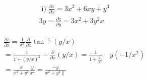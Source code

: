 \documentclass[10pt]{article}
\begin{document}
$$
\begin{aligned}
& \text { i) } \frac{\partial z}{\partial x}=3 x^{2}+6 x y+y^{3} \\
& 3 y=\frac{\partial z}{\partial y}=3 x^{2}+3 y^{2} x
\end{aligned}
$$

$$
\begin{aligned}
& \frac{\partial z}{\partial x}=\frac{1}{x^{1}} \frac{\partial}{\partial x} \tan ^{-1}(y / x) \\
& =\frac{1}{1+(y / x)^{2}}-\frac{\partial}{\partial x}(y / x)=\frac{1}{1+\frac{y^{2}}{x^{2}}} \quad y\left(-1 / x^{2}\right) \\
& =\frac{x}{x^{2}+y^{2}} \frac{y}{x^{2}}=\frac{-y}{x^{2}+y^{2} \|}
\end{aligned}
$$
\end{document}
